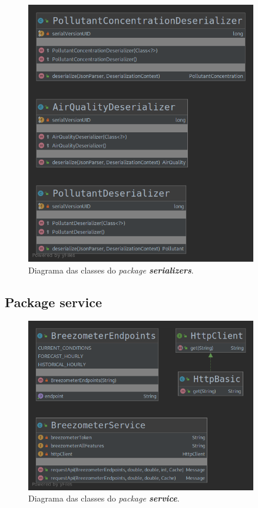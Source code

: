 \begin{figure}[h]
   \centering
   \includegraphics[width=0.90\textwidth]{images/serializers_diagram}
   \caption{Diagrama das classes do \textit{package \textbf{serializers}}.}
   \label{fig:serializers_diagram}
\end{figure}


\subsection{Package service}

\begin{figure}[h]
   \centering
   \includegraphics[width=0.90\textwidth]{images/service_diagram}
   \caption{Diagrama das classes do \textit{package \textbf{service}}.}
   \label{fig:service_diagram}
\end{figure}
